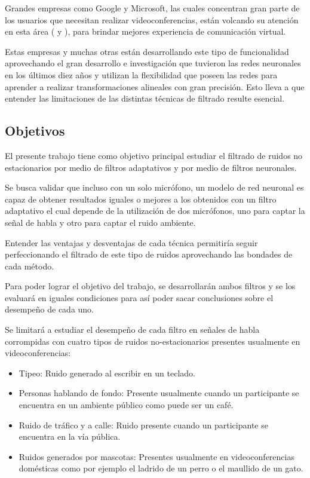 Grandes empresas como Google y Microsoft, las cuales concentran gran parte de los usuarios que necesitan realizar videoconferencias, están volcando su atención en esta área (\cite{interspeech_2020} y \cite{google_noise_filter}), para brindar mejores experiencia de comunicación virtual.

Estas empresas y muchas otras están desarrollando este tipo de funcionalidad aprovechando el gran desarrollo e investigación que tuvieron las redes neuronales en los últimos diez años y utilizan la flexibilidad que poseen las redes para aprender a realizar transformaciones alineales con gran precisión. Esto lleva a que entender las limitaciones de las distintas técnicas de filtrado resulte esencial.

\subsection{Objetivos}
\label{sec:objetivos}

El presente trabajo tiene como objetivo principal estudiar el filtrado de ruidos no estacionarios por medio de filtros adaptativos y por medio de filtros neuronales. 

Se busca validar que incluso con un solo micrófono, un modelo de red neuronal es capaz de obtener resultados iguales o mejores a los obtenidos con un filtro adaptativo el cual depende de la utilización de dos micrófonos, uno para captar la señal de habla y otro para captar el ruido ambiente.

Entender las ventajas y desventajas de cada técnica permitiría seguir perfeccionando el filtrado de este tipo de ruidos aprovechando las bondades de cada método.

Para poder lograr el objetivo del trabajo, se desarrollarán ambos filtros y se los evaluará en iguales condiciones para así poder sacar conclusiones sobre el desempeño de cada uno.

Se limitará a estudiar el desempeño de cada filtro en señales de habla corrompidas con cuatro tipos de  ruidos no-estacionarios presentes usualmente en videoconferencias:

\begin{itemize}
	\item Tipeo: Ruido generado al escribir en un teclado.
	\item Personas hablando de fondo: Presente usualmente cuando un participante se encuentra en un ambiente público como puede ser un café.
	\item Ruido de tráfico y a calle: Ruido presente cuando un participante se encuentra en la vía pública.
	\item Ruidos generados por mascotas: Presentes usualmente en videoconferencias domésticas como por ejemplo el ladrido de un perro o el maullido de un gato.
\end{itemize}

